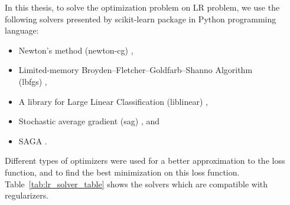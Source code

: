 In this thesis, to solve the optimization problem on LR problem, we use the following solvers presented by scikit-learn package \cite{scikit-learn} in Python programming language:

\begin{itemize}
    \item Newton’s method (newton-cg) \cite{lr_newton_cg}, 
    
    \item Limited-memory Broyden–Fletcher–Goldfarb–Shanno Algorithm \\(lbfgs) \cite{lr_lbfgsb},
    
    \item A library for Large Linear Classification (liblinear) \cite{lr_liblinear},
    
    \item Stochastic average gradient (sag) \cite{lr_sag}, and
    
    \item SAGA \cite{lr_saga}.
\end{itemize}

Different types of optimizers were used for a better approximation to the loss function, and to find the best minimization on this loss function. Table~\ref{tab:lr_solver_table} shows the solvers which are compatible with regularizers.


